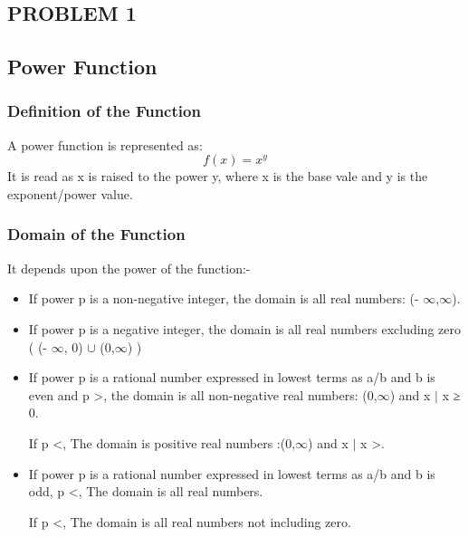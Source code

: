 \documentclass[a4paper,12pt]{article}
\begin{document}
\begin{center}
    \chapter{\Large\textbf{PROBLEM 1}}
\end{center}

\section{Power Function}
\subsection{Definition of the Function}
A power function is represented as:
\begin{equation} 
\label{Power_func}
f(x) = x^y
\end{equation}
It is read as x is raised to the power y, where x is the base vale and y is the exponent/power value. 


\subsection{Domain of the Function}
It depends upon the power of the function:-
\begin{itemize}

	\item If power p is a non-negative integer, the domain is all real numbers:  (- $\infty$,$\infty$).
	
	\item If power p is a negative integer, the domain is all real numbers excluding zero ( (- $\infty$, 0) $\cup$ (0,$\infty$) )
	
	\item If power p is a rational number expressed in lowest terms as a/b and b is even and p \textgreater {}, the domain is all non-negative real numbers: (0,$\infty$) and {x $\mid$ x ≥ 0}.
	
	If p \textless {}, The domain is positive real numbers :(0,$\infty$) and {x $\mid$ x \textgreater {}}.
	
	\item If power p is a rational number expressed in lowest terms as a/b and b is odd, p \textless {}, The domain is all real numbers.
	
	If p \textless {}, The domain is all real numbers not including zero.

\end{itemize}
\end{document}
